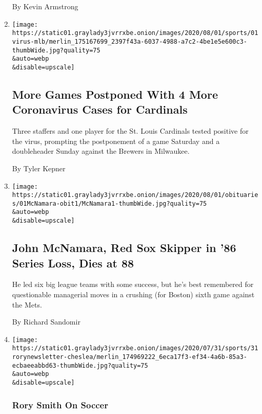 \begin{enumerate}
  By Kevin Armstrong
\item
  \href{/2020/08/01/sports/baseball/coronavirus-cardinals.html}{}

  \texttt{[image: https://static01.graylady3jvrrxbe.onion/images/2020/08/01/sports/01virus-mlb/merlin\_175167699\_2397f43a-6037-4988-a7c2-4be1e5e600c3-thumbWide.jpg?quality=75\\\&auto=webp\\\&disable=upscale]}

  \hypertarget{more-games-postponed-with-4-more-coronavirus-cases-for-cardinals}{%
  \subsection{More Games Postponed With 4 More Coronavirus Cases for
  Cardinals}\label{more-games-postponed-with-4-more-coronavirus-cases-for-cardinals}}

  Three staffers and one player for the St. Louis Cardinals tested
  positive for the virus, prompting the postponement of a game Saturday
  and a doubleheader Sunday against the Brewers in Milwaukee.

  By Tyler Kepner
\item
  \href{/2020/07/31/sports/baseball/john-mcnamara-dead.html}{}

  \texttt{[image: https://static01.graylady3jvrrxbe.onion/images/2020/08/01/obituaries/01McNamara-obit1/McNamara1-thumbWide.jpg?quality=75\\\&auto=webp\\\&disable=upscale]}

  \hypertarget{john-mcnamara-red-sox-skipper-in-86-series-loss-dies-at-88}{%
  \subsection{John McNamara, Red Sox Skipper in '86 Series Loss, Dies at
  88}\label{john-mcnamara-red-sox-skipper-in-86-series-loss-dies-at-88}}

  He led six big league teams with some success, but he's best
  remembered for questionable managerial moves in a crushing (for
  Boston) sixth game against the Mets.

  By Richard Sandomir
\item
  \href{/2020/07/31/sports/soccer/soccer-baseball.html}{}

  \texttt{[image: https://static01.graylady3jvrrxbe.onion/images/2020/07/31/sports/31rorynewsletter-cheslea/merlin\_174969222\_6eca17f3-ef34-4a6b-85a3-ecbaeeabbd63-thumbWide.jpg?quality=75\\\&auto=webp\\\&disable=upscale]}

  \hypertarget{rory-smith-on-soccer}{%
  \subsubsection{Rory Smith On Soccer}\label{rory-smith-on-soccer}}


\end{enumerate}
